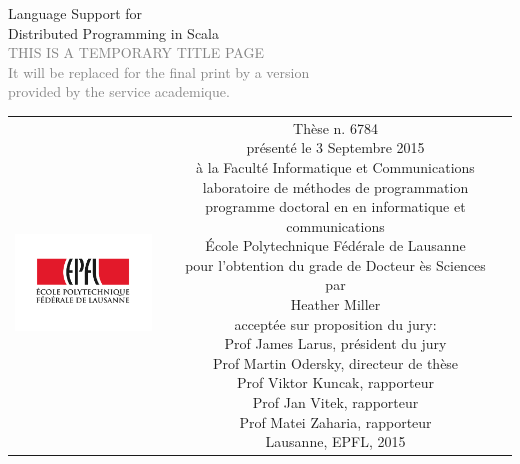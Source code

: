 \begin{titlepage}
\begin{center}
\sffamily


\null\vspace{2cm}
{\huge Language Support for \\[12pt] Distributed Programming in Scala} \\[24pt]
\textcolor{gray}{\small{THIS IS A TEMPORARY TITLE PAGE \\ It will be replaced for the final print by a version \\ provided by the service academique.}}

\vfill

\begin{tabular} {cc}
\parbox{0.3\textwidth}{\includegraphics[width=4cm]{images/epfl}}
&
\parbox{0.7\textwidth}{%
	Thèse n. 6784\\
	présenté le 3 Septembre 2015\\
	à la Faculté Informatique et Communications\\
	laboratoire de méthodes de programmation\\
	programme doctoral en en informatique et communications\\
%
	École Polytechnique Fédérale de Lausanne\\[6pt]
	pour l'obtention du grade de Docteur ès Sciences\\
	par\\ [4pt]
	\null \hspace{3em} Heather Miller\\[9pt]
%
\small
acceptée sur proposition du jury:\\[4pt]
%
    Prof James Larus, président du jury\\
    Prof Martin Odersky, directeur de thèse\\
    Prof Viktor Kuncak, rapporteur\\
    Prof Jan Vitek, rapporteur\\
    Prof Matei Zaharia, rapporteur\\[12pt]
%
Lausanne, EPFL, 2015}
\end{tabular}
\end{center}
\vspace{2cm}
\end{titlepage}
